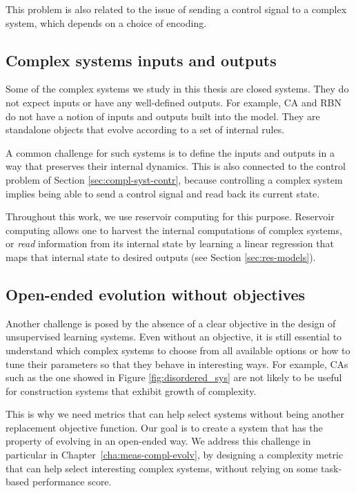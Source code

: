 This problem is also related to the issue of sending a control signal to a
complex system, which depends on a choice of encoding.

\subsection{Complex systems inputs and outputs\label{sec:compl-syst-inputs}}

Some of the complex systems we study in this thesis are closed systems. They do
not expect inputs or have any well-defined outputs. For example, \ac{CA} and
\ac{RBN} do not have a notion of inputs and outputs built into the model. They
are standalone objects that evolve according to a set of internal rules.

A common challenge for such systems is to define the inputs and outputs in a way
that preserves their internal dynamics. This is also connected to the control
problem of Section \ref{sec:compl-syst-contr}, because controlling a complex
system implies being able to send a control signal and read back its current
state.

Throughout this work, we use reservoir computing for this purpose. Reservoir
computing allows one to harvest the internal computations of complex systems, or
\emph{read} information from its internal state by learning a linear regression
that maps that internal state to desired outputs (see Section
\ref{sec:res-models}).



\subsection{Open-ended evolution without
  objectives}\label{sec:open-ended-evolution}

Another challenge is posed by the absence of a clear objective in the design of
unsupervised learning systems. Even without an objective, it is still essential
to understand which complex systems to choose from all available options or how
to tune their parameters so that they behave in interesting ways. For example,
\acp{CA} such as the one showed in Figure \ref{fig:disordered_sys} are not
likely to be useful for construction systems that exhibit growth of complexity.

This is why we need metrics that can help select systems without being another
replacement objective function. Our goal is to create a system that has the
property of evolving in an open-ended way. We address this challenge in
particular in Chapter~\ref{cha:meas-compl-evolv}, by designing a complexity
metric that can help select interesting complex systems, without relying on some
task-based performance score.

